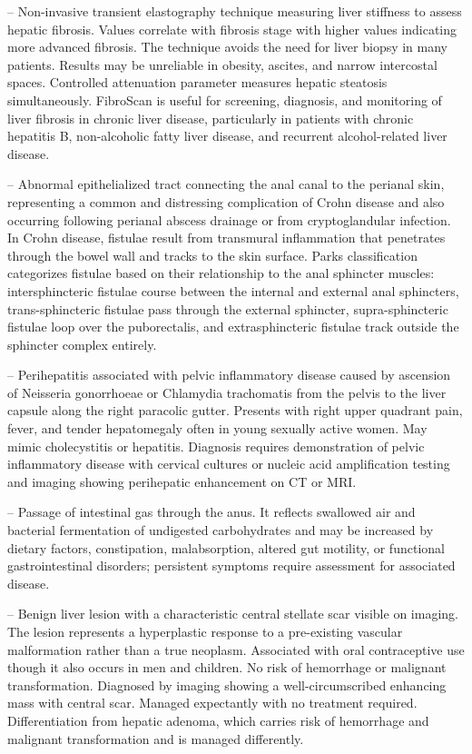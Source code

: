 -- Non-invasive transient elastography technique measuring liver stiffness to assess hepatic fibrosis. Values correlate with fibrosis stage with higher values indicating more advanced fibrosis. The technique avoids the need for liver biopsy in many patients. Results may be unreliable in obesity, ascites, and narrow intercostal spaces. Controlled attenuation parameter measures hepatic steatosis simultaneously. FibroScan is useful for screening, diagnosis, and monitoring of liver fibrosis in chronic liver disease, particularly in patients with chronic hepatitis B, non-alcoholic fatty liver disease, and recurrent alcohol-related liver disease.

-- Abnormal epithelialized tract connecting the anal canal to the perianal skin, representing a common and distressing complication of Crohn disease and also occurring following perianal abscess drainage or from cryptoglandular infection. In Crohn disease, fistulae result from transmural inflammation that penetrates through the bowel wall and tracks to the skin surface. Parks classification categorizes fistulae based on their relationship to the anal sphincter muscles: intersphincteric fistulae course between the internal and external anal sphincters, trans-sphincteric fistulae pass through the external sphincter, supra-sphincteric fistulae loop over the puborectalis, and extrasphincteric fistulae track outside the sphincter complex entirely.

-- Perihepatitis associated with pelvic inflammatory disease caused by ascension of Neisseria gonorrhoeae or Chlamydia trachomatis from the pelvis to the liver capsule along the right paracolic gutter. Presents with right upper quadrant pain, fever, and tender hepatomegaly often in young sexually active women. May mimic cholecystitis or hepatitis. Diagnosis requires demonstration of pelvic inflammatory disease with cervical cultures or nucleic acid amplification testing and imaging showing perihepatic enhancement on CT or MRI.

-- Passage of intestinal gas through the anus. It reflects swallowed air and bacterial fermentation of undigested carbohydrates and may be increased by dietary factors, constipation, malabsorption, altered gut motility, or functional gastrointestinal disorders; persistent symptoms require assessment for associated disease.

-- Benign liver lesion with a characteristic central stellate scar visible on imaging. The lesion represents a hyperplastic response to a pre-existing vascular malformation rather than a true neoplasm. Associated with oral contraceptive use though it also occurs in men and children. No risk of hemorrhage or malignant transformation. Diagnosed by imaging showing a well-circumscribed enhancing mass with central scar. Managed expectantly with no treatment required. Differentiation from hepatic adenoma, which carries risk of hemorrhage and malignant transformation and is managed differently.

